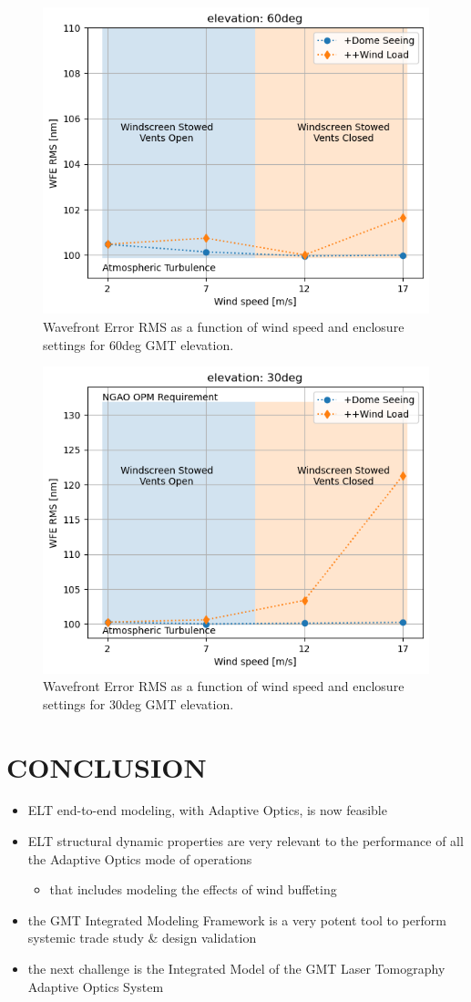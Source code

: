 \documentclass[]{AO4ELT}  %
\begin{document}
\begin{figure}
   \centering
   \includegraphics[width=0.5\linewidth]{wfe-rms_el60.png}
   \caption{Wavefront Error RMS as a function of wind speed and enclosure settings for 60deg GMT elevation.}
   \label{fig:18b}
\end{figure}

\begin{figure}
   \centering
   \includegraphics[width=0.5\linewidth]{wfe-rms_el30.png}
   \caption{Wavefront Error RMS as a function of wind speed and enclosure settings for 30deg GMT elevation.}
   \label{fig:18c}
\end{figure}

\clearpage

\section{CONCLUSION}
\label{sec:conclusion}

\begin{itemize}
   \item ELT end-to-end modeling, with Adaptive Optics, is now feasible
   \item ELT structural dynamic properties are very relevant to the performance of all the Adaptive Optics mode of operations
         \begin{itemize}
            \item that includes modeling the effects of wind buffeting
         \end{itemize}
   \item the GMT Integrated Modeling Framework is a very potent tool to perform systemic trade study \& design validation
   \item the next challenge is the Integrated Model of the GMT Laser Tomography Adaptive Optics System
\end{itemize}

\printbibliography %
\end{document}
